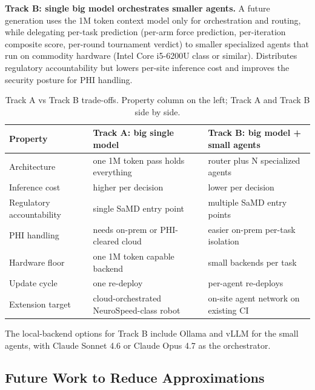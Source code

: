 \textbf{Track B: single big model orchestrates smaller agents.} A
future generation uses the 1M token context model only for
orchestration and routing, while delegating per-task prediction
(per-arm force prediction, per-iteration composite score, per-round
tournament verdict) to smaller specialized agents that run on
commodity hardware (Intel Core i5-6200U class or similar).
Distributes regulatory accountability but lowers per-site inference
cost and improves the security posture for PHI handling.

\begin{table}[H]
\centering
\caption{Track A vs Track B trade-offs. Property column on the left;
Track A and Track B side by side.}
\label{tab:tracks}
\begin{tabular}{>{\raggedright\arraybackslash}p{2.8cm}
                >{\raggedright\arraybackslash}p{5.4cm}
                >{\raggedright\arraybackslash}p{5.4cm}}
\toprule
\textbf{Property} & \textbf{Track A: big single model} & \textbf{Track B: big model + small agents} \\
\midrule
Architecture & one 1M token pass holds everything & router plus N specialized agents \\
Inference cost & higher per decision & lower per decision \\
Regulatory accountability & single SaMD entry point & multiple SaMD entry points \\
PHI handling & needs on-prem or PHI-cleared cloud & easier on-prem per-task isolation \\
Hardware floor & one 1M token capable backend & small backends per task \\
Update cycle & one re-deploy & per-agent re-deploys \\
Extension target & cloud-orchestrated NeuroSpeed-class robot & on-site agent network on existing CI \\
\bottomrule
\end{tabular}
\end{table}

The local-backend options for Track B include Ollama \cite{ollama}
and vLLM \cite{vllm} for the small agents, with Claude Sonnet 4.6
\cite{claude-sonnet-46} or Claude Opus 4.7 \cite{claude-opus-47} as
the orchestrator.

\subsection{Future Work to Reduce Approximations}
\label{sec:limits-future}

